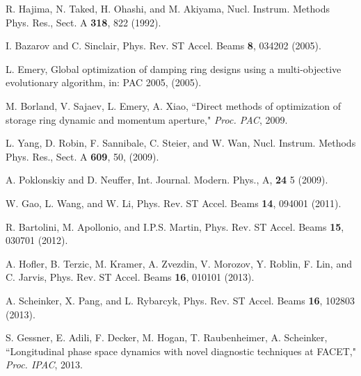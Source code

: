 \documentclass[%
twocolumn,
showpacs,preprintnumbers,
 aps,
prstab,
]{revtex4-1}
\begin{document}
\begin{thebibliography}{99}

 R. Hajima, N. Taked, H. Ohashi, and M. Akiyama, Nucl. Instrum. Methods Phys. Res., Sect. A {\bf 318}, 822 (1992).

 I. Bazarov and C. Sinclair, Phys. Rev. ST Accel. Beams {\bf 8}, 034202 (2005).

 L. Emery, Global optimization of damping ring designs using a multi-objective evolutionary algorithm, in: PAC 2005, (2005).

 M. Borland, V. Sajaev, L. Emery, A. Xiao, ``Direct methods of optimization of storage ring dynamic and momentum aperture," {\it Proc. PAC}, 2009.

 L. Yang, D. Robin, F. Sannibale, C. Steier, and W. Wan, Nucl. Instrum. Methods Phys. Res., Sect. A {\bf 609}, 50, (2009).

 A. Poklonskiy and D. Neuffer, Int. Journal. Modern. Phys., A, {\bf 24} 5 (2009).

 W. Gao, L. Wang, and W. Li, Phys. Rev. ST Accel. Beams {\bf 14}, 094001 (2011).

 R. Bartolini, M. Apollonio, and I.P.S. Martin, Phys. Rev. ST Accel. Beams {\bf 15}, 030701 (2012).

 A. Hofler, B. Terzic, M. Kramer, A. Zvezdin, V. Morozov, Y. Roblin, F. Lin, and C. Jarvis, Phys. Rev. ST Accel. Beams {\bf 16}, 010101 (2013).

 A. Scheinker, X. Pang, and L. Rybarcyk, Phys. Rev. ST Accel. Beams {\bf 16}, 102803 (2013).

 S. Gessner, E. Adili, F. Decker, M. Hogan, T. Raubenheimer, A. Scheinker, ``Longitudinal phase space dynamics with novel diagnostic techniques at FACET," {\it Proc. IPAC}, 2013.

\end{thebibliography}
\end{document}
